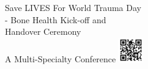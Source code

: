 \documentclass[25pt,a1paper]{tikzposter}
\begin{document}

\begin{center} %

\begin{tikzfigure}[]

 \hspace{20cm}

\vspace{5cm}
\end{tikzfigure}
\end{center}



\fontsize{260}{300} \sc
Save LIVES For World Trauma Day \\
- Bone Health Kick-off and \\
 Handover Ceremony \\



\fontsize{260}{300} \sc
A Multi-Specialty Conference \includegraphics[width=0.08\textwidth]{QRcode_2023MSC.png}


\end{document}
